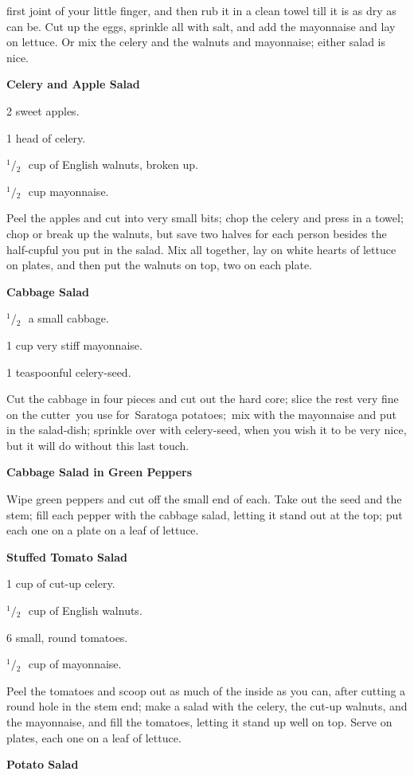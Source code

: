 \documentclass[11pt]{book}
\newcommand{\indpar}{\par\noindent\hspace*{\parindent}}
\newcommand{\ingredient}{\indpar}
\newcommand{\instruction}{\indpar}
\newcommand{\OneHalf}{\ensuremath{{}^1\!\!/\!{}_2\mbox{\ }}}
\newenvironment{RecipeTitle}{\medskip\begin{center}\large\bf }{\end{center}\smallskip}
\begin{document}
first joint of your little finger, and then rub it in a clean
towel till it is as dry as can be.  Cut up the eggs, sprinkle
all with salt, and add the mayonnaise and lay on lettuce.
Or mix the celery and the walnuts and mayonnaise; either
salad is nice.
\begin{RecipeTitle}
Celery and Apple Salad\label{celery_and_apple_salad}
\end{RecipeTitle}
\ingredient  2 sweet apples.
\ingredient  1 head of celery.
\ingredient  \OneHalf cup of English walnuts, broken up.
\ingredient  \OneHalf cup mayonnaise.
\instruction
  Peel the apples and cut into very small bits; chop the celery
and press in a towel; chop or break up the walnuts, but save
two halves for each person besides the half-cupful you put in
the salad.  Mix all together, lay on white hearts of lettuce
on plates, and then put the walnuts on top, two on each plate.
\begin{RecipeTitle}
Cabbage Salad\label{cabbage_salad}
\end{RecipeTitle}
\ingredient  \OneHalf a small cabbage.
\ingredient  1 cup very stiff mayonnaise.
\ingredient  1 teaspoonful celery-seed.
\instruction
  Cut the cabbage in four pieces and cut out the hard core;
slice the rest very fine on the cutter\, you use for\, Saratoga
potatoes;\, mix with the mayonnaise and put in the salad-dish;
sprinkle over with celery-seed, when you wish it to be very
nice, but it will do without this last touch.
\begin{RecipeTitle}
Cabbage Salad in Green Peppers\label{cabbage_in_green_peppers_salad}
\end{RecipeTitle}
\instruction
  Wipe green peppers and cut off the small end of each.
Take out the seed and the stem; fill each pepper with the
cabbage salad, letting it stand out at the top; put each
one on a plate on a leaf of lettuce.\pagebreak[4]
\begin{RecipeTitle}
Stuffed Tomato Salad\label{stuffed_tomato_salad}
\end{RecipeTitle}
\ingredient  1 cup of cut-up celery.
\ingredient  \OneHalf cup of English walnuts.
\ingredient  6 small, round tomatoes.
\ingredient  \OneHalf cup of mayonnaise.
\instruction
  Peel the tomatoes and scoop out as much of the inside as
you can, after cutting a round hole in the stem end; make a
salad with the celery, the cut-up walnuts, and the mayonnaise,
and fill the tomatoes, letting it stand up well on top.
Serve on plates, each one on a leaf of lettuce.
\begin{RecipeTitle}
Potato Salad\label{potato_salad}
\end{RecipeTitle}
\end{document}
